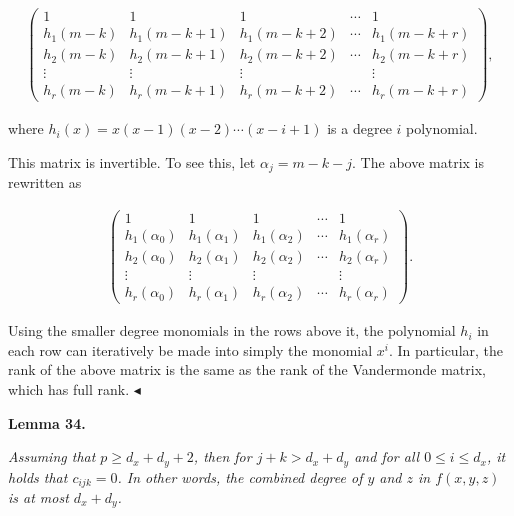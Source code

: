 \documentclass[10pt,a4paper]{article}
\begin{document}
\[\begin{gathered}
\begin{pmatrix}1&1&1&\cdots&1\\
h_{1}(m-k)&h_{1}(m-k+1)&h_{1}(m-k+2)&\cdots&h_{1}(m-k+r)\\
h_{2}(m-k)&h_{2}(m-k+1)&h_{2}(m-k+2)&\cdots&h_{2}(m-k+r)\\
\vdots&\vdots&\vdots&&\vdots\\
h_{r}(m-k)&h_{r}(m-k+1)&h_{r}(m-k+2)&\cdots&h_{r}(m-k+r)\end{pmatrix},
\end{gathered}\]


where $h_{i}(x)=x(x-1)(x-2)\cdots(x-i+1)$ is a degree $i$ polynomial.\par




This matrix is invertible. To see this, let $\alpha_{j}=m-k-j$. The above matrix is rewritten as\par


\[\begin{gathered}
\begin{pmatrix}1&1&1&\cdots&1\\
h_{1}(\alpha_{0})&h_{1}(\alpha_{1})&h_{1}(\alpha_{2})&\cdots&h_{1}(\alpha_{r})\\
h_{2}(\alpha_{0})&h_{2}(\alpha_{1})&h_{2}(\alpha_{2})&\cdots&h_{2}(\alpha_{r})\\
\vdots&\vdots&\vdots&&\vdots\\
h_{r}(\alpha_{0})&h_{r}(\alpha_{1})&h_{r}(\alpha_{2})&\cdots&h_{r}(\alpha_{r})\end{pmatrix}.
\end{gathered}\]


Using the smaller degree monomials in the rows above it, the polynomial $h_{i}$ in each row can iteratively be made into simply the monomial $x^{i}$. In particular, the rank of the above matrix is the same as the rank of the Vandermonde matrix, which has full rank.
$\blacktriangleleft$\par





\par\medskip\noindent\textbf{
\textbf{Lemma 34}\textbf{.}
}\par



\emph{Assuming that $p\geq d_{x}+d_{y}+2$, then for $j+k>d_{x}+d_{y}$ and for all $0\leq i\leq d_{x}$, it holds that $c_{ijk}=0$. In other words, the combined degree of $y$ and $z$ in $f(x,y,z)$ is at most $d_{x}+d_{y}$.}\par
\end{document}
